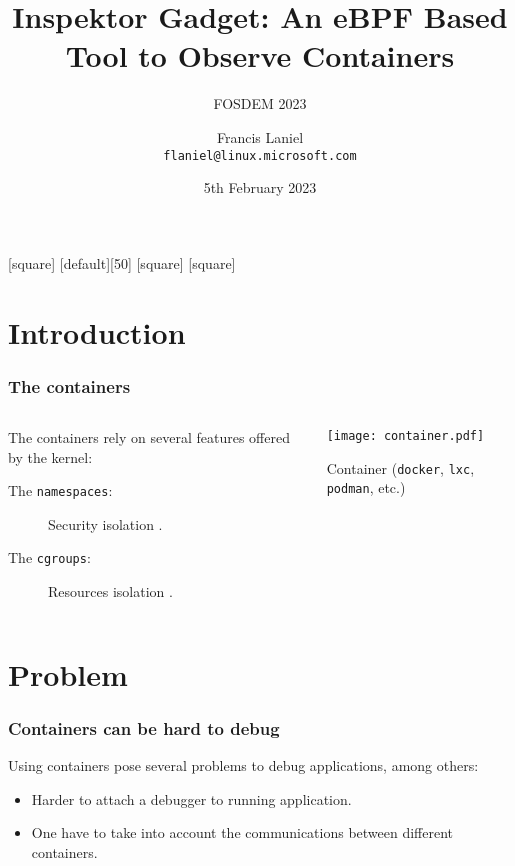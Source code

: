 \documentclass[table, trans, aspectratio = 169]{beamer}
\title[FOSDEM 2023]{Inspektor Gadget: An eBPF Based Tool to Observe Containers}
\subtitle{FOSDEM 2023}
\author[Francis Laniel (\texttt{flaniel@linux.microsoft.com})]{Francis Laniel\\\texttt{flaniel@linux.microsoft.com}}
\date{5th February 2023}
\begin{document}
	[square]
	[default][50]
	[square]
	[square]

	\maketitle

	\section{Introduction}
	\begin{frame}
		\frametitle{The containers}

		\begin{columns}
			\begin{column}{.5\textwidth}
				The containers rely on several features offered by the kernel:
				\begin{description}
					\item[The \texttt{namespaces}:] Security isolation \cite{rami_rosen_namespace_2016, kerrisk_lce_2012, kerrisk_namespaces_2013}.
					\item[The \texttt{cgroups}:] Resources isolation \cite{rami_rosen_namespace_2016, hiroyu_cgroup_2008}.
				\end{description}
			\end{column}
			\begin{column}{.5\textwidth}
				\centering

				\texttt{[image: container.pdf]}

				Container (\texttt{docker}, \texttt{lxc}, \texttt{podman}, etc.)
			\end{column}
		\end{columns}
	\end{frame}

	\section{Problem}
	\begin{frame}
		\frametitle{Containers can be hard to debug}

		Using containers pose several problems to debug applications, among others:
		\begin{itemize}
			\item Harder to attach a debugger to running application.
			\item One have to take into account the communications between different containers.
		\end{itemize}
	\end{frame}
\end{document}
